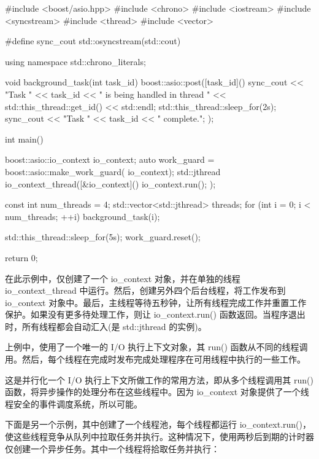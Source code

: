 \begin{cpp}
#include <boost/asio.hpp>
#include <chrono>
#include <iostream>
#include <syncstream>
#include <thread>
#include <vector>

#define sync_cout std::osyncstream(std::cout)

using namespace std::chrono_literals;

void background_task(int task_id) {
    boost::asio::post([task_id]() {
        sync_cout << "Task " << task_id
                  << " is being handled in thread "
                  << std::this_thread::get_id()
                  << std::endl;
        std::this_thread::sleep_for(2s);
        sync_cout << "Task " << task_id
        << " complete.\n";
    });
}

int main() {
    boost::asio::io_context io_context;
    auto work_guard = boost::asio::make_work_guard(
                                    io_context);
    std::jthread io_context_thread([&io_context]() {
        io_context.run();
    });

    const int num_threads = 4;
    std::vector<std::jthread> threads;
    for (int i = 0; i < num_threads; ++i) {
        background_task(i);
    }

    std::this_thread::sleep_for(5s);
    work_guard.reset();

    return 0;
}
\end{cpp}

在此示例中，仅创建了一个 io\_context 对象，并在单独的线程 io\_context\_thread 中运行。然后，创建另外四个后台线程，将工作发布到 io\_context 对象中。最后，主线程等待五秒钟，让所有线程完成工作并重置工作保护。如果没有更多待处理工作，则让 io\_context.run() 函数返回。当程序退出时，所有线程都会自动汇入(是 std::jthread 的实例)。


上例中，使用了一个唯一的 I/O 执行上下文对象，其 run() 函数从不同的线程调用。然后，每个线程在完成时发布完成处理程序在可用线程中执行的一些工作。

这是并行化一个 I/O 执行上下文所做工作的常用方法，即从多个线程调用其 run() 函数，将异步操作的处理分布在这些线程中。因为 io\_context 对象提供了一个线程安全的事件调度系统，所以可能。

下面是另一个示例，其中创建了一个线程池，每个线程都运行 io\_context.run()，使这些线程竞争从队列中拉取任务并执行。这种情况下，使用两秒后到期的计时器仅创建一个异步任务。其中一个线程将拾取任务并执行：

